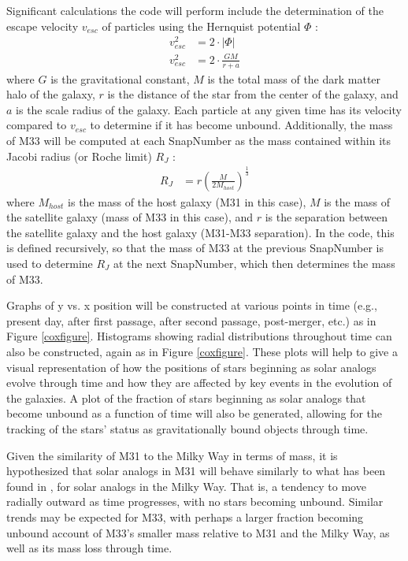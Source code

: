 \documentclass{aastex63}
\begin{document}
Significant calculations the code will perform include the determination of the escape velocity $v_{esc}$ of particles using the Hernquist potential $\Phi$ \citep{hernquist90}:
\begin{align}
    v_{esc}^2 &= 2 \cdot |\Phi|\\
    v_{esc}^2 &= 2 \cdot \frac{GM}{r+a} \label{escapevelocityequation}
\end{align}
where $G$ is the gravitational constant, $M$ is the total mass of the dark matter halo of the galaxy, $r$ is the distance of the star from the center of the galaxy, and $a$ is the scale radius of the galaxy. Each particle at any given time has its velocity compared to $v_{esc}$ to determine if it has become unbound. Additionally, the mass of M33 will be computed at each SnapNumber as the mass contained within its Jacobi radius (or Roche limit) $R_J$ \citep{carroll96}:
\begin{align}
    R_J &= r \left( \frac{M}{2M_{host}} \right)^{\frac{1}{3}}
\end{align}
where $M_{host}$ is the mass of the host galaxy (M31 in this case), $M$ is the mass of the satellite galaxy (mass of M33 in this case), and $r$ is the separation between the satellite galaxy and the host galaxy (M31-M33 separation). In the code, this is defined recursively, so that the mass of M33 at the previous SnapNumber is used to determine $R_J$ at the next SnapNumber, which then determines the mass of M33.

Graphs of y vs. x position will be constructed at various points in time (e.g., present day, after first passage, after second passage, post-merger, etc.) as in Figure \ref{coxfigure}. Histograms showing radial distributions throughout time can also be constructed, again as in Figure \ref{coxfigure}. These plots will help to give a visual representation of how the positions of stars beginning as solar analogs evolve through time and how they are affected by key events in the evolution of the galaxies. A plot of the fraction of stars beginning as solar analogs that become unbound as a function of time will also be generated, allowing for the tracking of the stars' status as gravitationally bound objects through time.


\indent Given the similarity of M31 to the Milky Way in terms of mass, it is hypothesized that solar analogs in M31 will behave similarly to what has been found in \cite{cox08}, \cite{van12} for solar analogs in the Milky Way. That is, a tendency to move radially outward as time progresses, with no stars becoming unbound. Similar trends may be expected for M33, with perhaps a larger fraction becoming unbound account of M33's smaller mass relative to M31 and the Milky Way, as well as its mass loss through time. 
\end{document}
